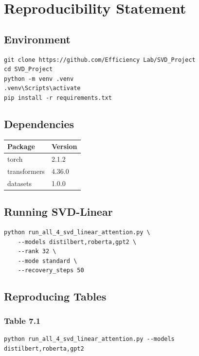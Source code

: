 
\section{Reproducibility Statement}

\subsection{Environment}

\begin{lstlisting}
git clone https://github.com/Efficiency Lab/SVD_Project
cd SVD_Project
python -m venv .venv
.venv\Scripts\activate
pip install -r requirements.txt
\end{lstlisting}

\subsection{Dependencies}

\begin{table}[H]
\centering
\small
\begin{tabular}{ll}
\toprule
\textbf{Package} & \textbf{Version} \\
\midrule
torch & 2.1.2 \\
transformers & 4.36.0 \\
datasets & 1.0.0 \\
\bottomrule
\end{tabular}
\end{table}

\subsection{Running SVD-Linear}

\begin{lstlisting}
python run_all_4_svd_linear_attention.py \
    --models distilbert,roberta,gpt2 \
    --rank 32 \
    --mode standard \
    --recovery_steps 50
\end{lstlisting}

\subsection{Reproducing Tables}

\subsubsection{Table 7.1}
\begin{lstlisting}
python run_all_4_svd_linear_attention.py --models distilbert,roberta,gpt2
\end{lstlisting}

